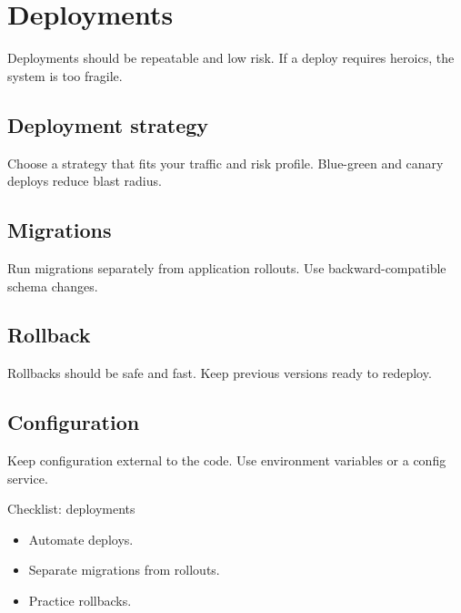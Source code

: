 \chapter{Deployments}

Deployments should be repeatable and low risk.
If a deploy requires heroics, the system is too fragile.

\section{Deployment strategy}
Choose a strategy that fits your traffic and risk profile.
Blue-green and canary deploys reduce blast radius.

\section{Migrations}
Run migrations separately from application rollouts.
Use backward-compatible schema changes.

\section{Rollback}
Rollbacks should be safe and fast.
Keep previous versions ready to redeploy.

\section{Configuration}
Keep configuration external to the code.
Use environment variables or a config service.

\begin{checklistbox}{Checklist: deployments}
\begin{itemize}[nosep]
  \item Automate deploys.
  \item Separate migrations from rollouts.
  \item Practice rollbacks.
\end{itemize}
\end{checklistbox}
